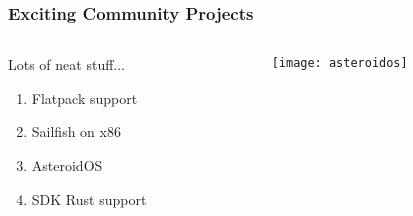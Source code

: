 \documentclass[
	notes=none,
	aspectratio=169
]{beamer}
\begin{document}

\begin{frame}
\frametitle{Exciting Community Projects}

\begin{columns}[T]
\begin{column}[T]{0.5\textwidth}
\setlength{\parskip}{0.5em}

\vspace{1.0cm}
Lots of neat stuff...
\begin{enumerate}
\setlength{\parskip}{0.5em}
\item Flatpack support
\item Sailfish on x86
\item AsteroidOS
\item SDK Rust support
\end{enumerate}

\end{column}

\begin{column}[T]{0.5\textwidth}
\setlength{\parskip}{0.5em}

\vspace{0.5cm}
\texttt{[image: asteroidos]}

\end{column}
\end{columns}

\end{frame}
\note{
}

\end{document}
